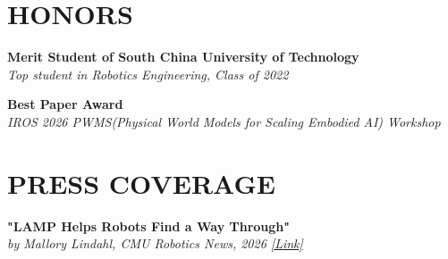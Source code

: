 \documentclass[a4paper,9pt]{extarticle}
\begin{document}
\section*{{\textbf{\fontsize{14pt}{8pt}\selectfont H}\textbf{\scshape ONORS}}}
\vspace{-0.10in}
\textbf{Merit Student of South China University of Technology}   \\
\textit{Top student in Robotics Engineering, Class of 2022 }
\par\vspace{2pt}\noindent
\textbf{Best Paper Award}   \\
\textit{IROS 2026 PWMS(Physical World Models for Scaling Embodied AI) Workshop}


\section*{{\textbf{\fontsize{14pt}{8pt}\selectfont P}\textbf{\scshape RESS COVERAGE}}}
\vspace{-0.10in}
\textbf{"LAMP Helps Robots Find a Way Through"}  \\
\textit{by Mallory Lindahl, CMU Robotics News, 2026 \href{https://www.ri.cmu.edu/lamp-helps-robots-find-a-way-through/}{[Link]}}
\end{document}
